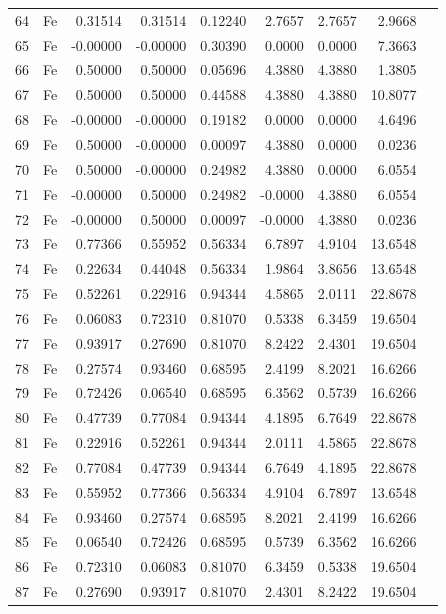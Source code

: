 \begin{longtable}{rlrrrrrrl}
64 & Fe & 0.31514 & 0.31514 & 0.12240 & 2.7657 & 2.7657 & 2.9668 &  \\
65 & Fe & -0.00000 & -0.00000 & 0.30390 & 0.0000 & 0.0000 & 7.3663 &  \\
66 & Fe & 0.50000 & 0.50000 & 0.05696 & 4.3880 & 4.3880 & 1.3805 &  \\
67 & Fe & 0.50000 & 0.50000 & 0.44588 & 4.3880 & 4.3880 & 10.8077 &  \\
68 & Fe & -0.00000 & -0.00000 & 0.19182 & 0.0000 & 0.0000 & 4.6496 &  \\
69 & Fe & 0.50000 & -0.00000 & 0.00097 & 4.3880 & 0.0000 & 0.0236 &  \\
70 & Fe & 0.50000 & -0.00000 & 0.24982 & 4.3880 & 0.0000 & 6.0554 &  \\
71 & Fe & -0.00000 & 0.50000 & 0.24982 & -0.0000 & 4.3880 & 6.0554 &  \\
72 & Fe & -0.00000 & 0.50000 & 0.00097 & -0.0000 & 4.3880 & 0.0236 &  \\
73 & Fe & 0.77366 & 0.55952 & 0.56334 & 6.7897 & 4.9104 & 13.6548 &  \\
74 & Fe & 0.22634 & 0.44048 & 0.56334 & 1.9864 & 3.8656 & 13.6548 &  \\
75 & Fe & 0.52261 & 0.22916 & 0.94344 & 4.5865 & 2.0111 & 22.8678 &  \\
76 & Fe & 0.06083 & 0.72310 & 0.81070 & 0.5338 & 6.3459 & 19.6504 &  \\
77 & Fe & 0.93917 & 0.27690 & 0.81070 & 8.2422 & 2.4301 & 19.6504 &  \\
78 & Fe & 0.27574 & 0.93460 & 0.68595 & 2.4199 & 8.2021 & 16.6266 &  \\
79 & Fe & 0.72426 & 0.06540 & 0.68595 & 6.3562 & 0.5739 & 16.6266 &  \\
80 & Fe & 0.47739 & 0.77084 & 0.94344 & 4.1895 & 6.7649 & 22.8678 &  \\
81 & Fe & 0.22916 & 0.52261 & 0.94344 & 2.0111 & 4.5865 & 22.8678 &  \\
82 & Fe & 0.77084 & 0.47739 & 0.94344 & 6.7649 & 4.1895 & 22.8678 &  \\
83 & Fe & 0.55952 & 0.77366 & 0.56334 & 4.9104 & 6.7897 & 13.6548 &  \\
84 & Fe & 0.93460 & 0.27574 & 0.68595 & 8.2021 & 2.4199 & 16.6266 &  \\
85 & Fe & 0.06540 & 0.72426 & 0.68595 & 0.5739 & 6.3562 & 16.6266 &  \\
86 & Fe & 0.72310 & 0.06083 & 0.81070 & 6.3459 & 0.5338 & 19.6504 &  \\
87 & Fe & 0.27690 & 0.93917 & 0.81070 & 2.4301 & 8.2422 & 19.6504 &  \\

\end{longtable}
